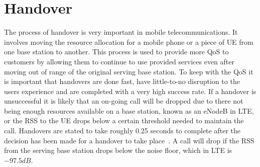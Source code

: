 \section{Handover}\label{handover}
The process of handover is very important in mobile telecommunications. It involves moving the resource allocation for a mobile phone or a piece of \ac{UE} from one base station to another. This process is used to provide more \ac{QoS} to customers by allowing them to continue to use provided services even after moving out of range of the original serving base station. To keep with the QoS it is important that handovers are done fast, have little-to-no disruption to the users experience and are completed with a very high success rate. If a handover is unsuccessful it is likely that an on-going call will be dropped due to there not being enough resources available on a base station, known as an \ac{eNodeB} in \ac{LTE}, or the \ac{RSS} to the \ac{UE} drops below a certain threshold needed to maintain the call. Handovers are stated to take roughly 0.25 seconds to complete after the decision has been made for a handover to take place~\cite{jansen2010handover}. A call will drop if the \ac{RSS} from the serving base station drops below the noise floor, which in LTE is $-97.5 dB$.
